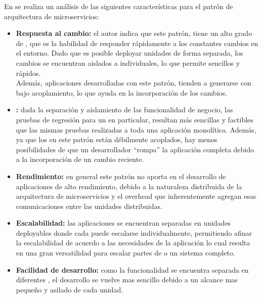En \cite[p.~34]{richards2015} se realiza un análisis de las siguientes características para el patrón de arquitectura de microservicios:

\begin{itemize}
  \item \textbf{Respuesta al cambio:} el autor indica que este patrón, tiene un alto grado de , que es la habilidad de responder rápidamente a los constantes cambios en el entorno.  Dado que es posible deployar unidades de forma separada, los cambios se encuentran aislados a  individuales, lo que permite  sencillos y rápidos.\\
  Además, aplicaciones desarrolladas con este patrón, tienden a generarse con bajo acoplamiento, lo que ayuda en la incorporación de los cambios.

  \item \textbf{:} dada la separación y aislamiento de las funcionalidad de negocio, las pruebas de regresión para un  en particular, resultan más sencillas y factibles que las mismas pruebas realizadas a toda una aplicación monolítica.  Además, ya que los  en este patrón están débilmente acoplados, hay menos posibilidades de que un desarrollador ``rompa'' la aplicación completa debido a la incorporación de un cambio reciente.

  \item \textbf{Rendimiento:} en general este patrón no aporta en el desarrollo de aplicaciones de alto rendimiento, debido a la naturaleza distribuida de la arquitectura de microservicios y el overhead que inherentemente agregan esas comunicaciones entre las unidades distribuidas.

  \item \textbf{Escalabilidad:} las aplicaciones se encuentran separadas en unidades deployables donde cada  puede escalarse individualmente, permitiendo afinar la escalabilidad de acuerdo a las necesidades de la aplicación lo cual resulta en una gran versatilidad para escalar partes de o un sistema completo.

  \item \textbf{Facilidad de desarrollo:} como la funcionalidad se encuentra separada en diferentes , el desarrollo se vuelve mas sencillo debido a un alcance mas pequeño y asilado de cada unidad.
\end{itemize}
